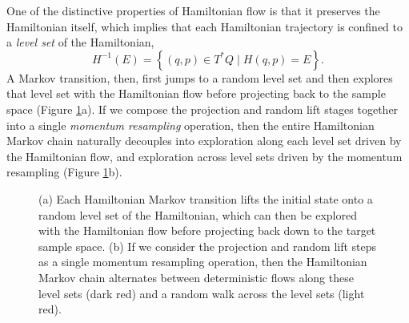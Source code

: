 \documentclass[stslayout]{imsart}
\begin{document}
One of the distinctive properties of Hamiltonian flow is that it
preserves the Hamiltonian itself, which implies that each Hamiltonian
trajectory is confined to a \emph{level set} of the Hamiltonian,
%
\begin{equation*}
H^{-1} \! \left( E \right) 
= 
\left\{ (q, p) \in T^{*} Q \mid H \! \left( q, p \right) = E \right\}.
\end{equation*}
%
A Markov transition, then, first jumps to a random level set and
then explores that level set with the Hamiltonian flow before
projecting back to the sample space (Figure \ref{fig:hmc_chain_cartoon}a).
If we compose the projection and random lift stages together into a single
\emph{momentum resampling} operation, then the entire Hamiltonian 
Markov chain naturally decouples into exploration along each level set 
driven by the Hamiltonian flow, and exploration across level sets driven
by the momentum resampling (Figure \ref{fig:hmc_chain_cartoon}b).

\begin{figure}
\centering
{}
\caption{(a) Each Hamiltonian Markov transition lifts the initial
state onto a random level set of the Hamiltonian, which can then
be explored with the Hamiltonian flow before projecting back down
to the target sample space.  (b) If we consider the projection 
and random lift steps as a single momentum resampling operation, 
then the Hamiltonian Markov chain alternates between deterministic 
flows along these level sets (dark red) and a random walk across the 
level sets (light red).}
\label{fig:hmc_chain_cartoon}
\end{figure}
\end{document}
